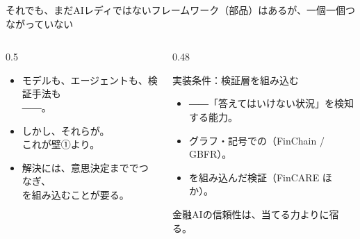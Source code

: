 \begin{frame}{それでも、まだAIレディではない}{フレームワーク（部品）はあるが、一個一個つながっていない}
  \begin{columns}[T]
    \begin{column}{0.5\textwidth}
      \begin{itemize}\wide
        \item モデルも、エージェントも、検証手法も\\
          ――。
        \item しかし、それらが。\\
          これが壁①より。
        \item 解決には、意思決定まででつなぎ、\\
          を組み込むことが要る。
      \end{itemize}
    \end{column}
    \begin{column}{0.48\textwidth}
      \begin{insight}{実装条件：検証層を組み込む}
        \footnotesize
        \begin{itemize}\setlength\itemsep{1mm}
          \item {}――「答えてはいけない状況」を検知する能力。
          \item グラフ・記号での（FinChain / GBFR）。
          \item {}を組み込んだ検証（FinCARE ほか）。
        \end{itemize}
        \vskip1mm
        {\color{brandgray} 金融AIの信頼性は、当てる力よりに宿る。}
      \end{insight}
    \end{column}
  \end{columns}
\end{frame}

